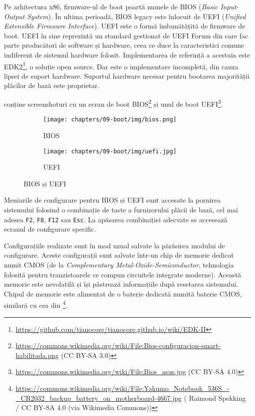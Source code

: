 Pe arhitectura x86, firmware-ul de boot poartă numele de BIOS (\textit{Basic
Input-Output System}). În ultima perioadă, BIOS legacy este înlocuit de UEFI
(\textit{Unified Extensible Firmware Interface}). UEFI este o formă îmbunătățită de
firmware de boot. UEFI în sine reprezintă un standard gestionat de UEFI Forum
din care fac parte producători de software și hardware, ceea ce duce la
caracteristici comune indiferent de sistemul hardware folosit. Implementarea
de referință a acestuia este EDK2\footnote{\url{https://github.com/tianocore/tianocore.github.io/wiki/EDK-II}}, o soluție open source. Dar este o implementare
incompletă, din cauza lipsei de suport hardware. Suportul hardware necesar pentru
bootarea majorității plăcilor de bază este proprietar.

 conține screenshoturi cu un ecran de boot BIOS\footnote{\url{https://commons.wikimedia.org/wiki/File:Bios-configuracion-smart-habilitada.png} (CC BY-SA 3.0)} și unul de boot
UEFI\footnote{\url{https://commons.wikimedia.org/wiki/File:Bios\_asus.jpg} (CC BY-SA 4.0)}.

\begin{figure}[!htbp]
  \centering
  \begin{subfigure}[b]{0.8\textwidth}
    \texttt{[image: chapters/09-boot/img/bios.png]}
    \caption{BIOS}
    \label{fig:intro:bios}
  \end{subfigure}

  \begin{subfigure}[b]{0.8\textwidth}
    \texttt{[image: chapters/09-boot/img/uefi.jpg]}
    \caption{UEFI}
    \label{fig:boot:uefi}
  \end{subfigure}
  \caption{BIOS și UEFI}
  \label{fig:boot:bios-uefi}
\end{figure}

Meniurile de configurare pentru BIOS și UEFI sunt accesate la pornirea sistemului
folosind o combinație de taste a furnizorului plăcii de bază, cel mai adesea \texttt{F2}, \texttt{F8}, \texttt{F12}
sau \texttt{Esc}. La apăsarea combinației adecvate se accesează ecranul de configurare
specific.

Configurațiile realizate sunt în mod uzual salvate la părăsirea modului de
configurare. Aceste configurații sunt salvate într-un chip de memorie dedicat
numit CMOS  (de la
\textit{Complementary Metal-Oxide-Semiconductor}, tehnologia folosită pentru
tranzistoarele ce compun circuitele integrate moderne). Această memorie este
nevolatilă și își păstrează informațiile după resetarea sistemului. Chipul de
memorie este alimentat de o baterie dedicată numită baterie CMOS, similară cu
cea din \footnote{\url{https://commons.wikimedia.org/wiki/File:Yakumo\_Notebook\_536S\_-\_CR2032\_backup\_battery\_on\_motherboard-4667.jpg} (\textcopyright{} Raimond Spekking / CC BY-SA 4.0 (via Wikimedia Commons))}.

